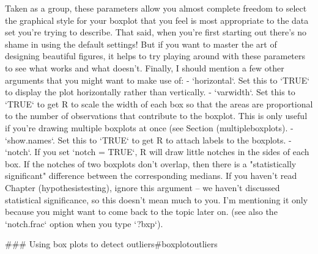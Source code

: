 Taken as a group, these parameters allow you almost complete freedom to select the graphical style for your boxplot that you feel is most appropriate to the data set you're trying to describe. That said, when you're first starting out there's no shame in using the default settings! But if you want to master the art of designing beautiful figures, it helps to try playing around with these parameters to see what works and what doesn't. Finally, I should mention a few  other arguments that you might want to make use of:
 \itemsep 1pt
- `horizontal`. Set this to `TRUE` to display the plot horizontally rather than vertically.
- `varwidth`. Set this to `TRUE` to get R to scale the width of each box so that the areas are proportional to the number of observations that contribute to the boxplot. This is only useful if you're drawing multiple boxplots at once (see Section \@ref(multipleboxplots).
- `show.names`. Set this to `TRUE` to get R to attach labels to the boxplots.
- `notch`. If you set `notch = TRUE`, R will draw little notches in the sides of each box. If the notches of two boxplots don't overlap, then there is a "statistically significant" difference between the corresponding medians. If you haven't read Chapter \@ref(hypothesistesting), ignore this argument -- we haven't discussed statistical significance, so this doesn't mean much to you. I'm mentioning it only because you might want to come back to the topic later on. (see also the `notch.frac` option when you type `?bxp`).




### Using box plots to detect outliers{#boxplotoutliers}

